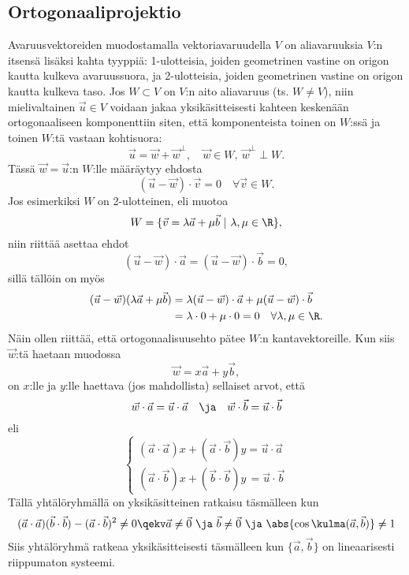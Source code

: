 
\subsection{Ortogonaaliprojektio}

Avaruusvektoreiden muodostamalla vektoriavaruudella $V$ on aliavaruuksia $V$:n itsensä lisäksi
kahta tyyppiä: 1-ulotteisia, joiden geometrinen vastine on origon kautta kulkeva avaruussuora,
ja 2-ulotteisia, joiden geometrinen vastine on origon kautta kulkeva taso.
Jos $W \subset V$ on $V$:n aito aliavaruus (ts. $W \neq V$), niin mielivaltainen $\vec u \in V$
voidaan jakaa yksikäsitteisesti kahteen keskenään ortogonaaliseen komponenttiin siten, että 
komponenteista toinen on $W$:ssä ja toinen $W$:tä vastaan kohtisuora:
\[
\vec u = \vec w + \vec w^{\perp}, \quad  \vec w \in W, \ \vec w^{\perp} \perp W.
\]
Tässä $\vec w = \vec u$:n  $W$:lle määräytyy ehdosta
\[
(\vec u - \vec w) \cdot \vec v = 0 \quad \forall \vec v \in W.
\]
Jos esimerkiksi $W$ on 2-ulotteinen, eli muotoa
\[
W=\{\vec v = \lambda \vec a + \mu \vec b \ | \ \lambda, \mu \in \R \},
\]
niin riittää asettaa ehdot
\[
(\vec u - \vec w) \cdot \vec a =(\vec u -\vec w) \cdot \vec b =0,
\]
sillä tällöin on myös
\begin{align*}
(\vec u - \vec w)(\lambda \vec a + \mu \vec b)
             &=\lambda(\vec u - \vec w) \cdot \vec a + \mu (\vec u-\vec w) \cdot \vec b \\
             &=\lambda \cdot 0 + \mu \cdot 0 = 0 \quad \forall \lambda, \mu \in \R.
\end{align*}
Näin ollen riittää, että ortogonaalisuusehto pätee $W$:n kantavektoreille. Kun siis $\vec w$:tä
haetaan muodossa
\[
\vec w = x \vec a +y \vec b,
\]
on $x$:lle ja $y$:lle haettava (jos mahdollista) sellaiset arvot, että
\[
\vec w \cdot \vec a = \vec u \cdot \vec a \quad \ja \quad \vec w \cdot \vec b 
                    = \vec u \cdot \vec b
\]
eli
\[ \begin{cases}
(\vec a \cdot \vec a)x+(\vec a \cdot \vec b)y  = \vec u \cdot \vec a \\
(\vec a \cdot \vec b)x+(\vec b \cdot \vec b)y\,= \vec u \cdot \vec b
\end{cases} \]
Tällä yhtälöryhmällä on yksikäsitteinen ratkaisu täsmälleen kun
\[
(\vec a \cdot \vec a)(\vec b \cdot \vec b) - (\vec a \cdot \vec b)^2 \neq 0
                                           \qekv \vec a \neq \vec 0\ 
                                            \ja\ \vec b \neq \vec 0\ 
                                            \ja\ \abs{\cos{\kulma(\vec a,\vec b)}} \neq 1
\]
Siis yhtälöryhmä ratkeaa yksikäsitteisesti täsmälleen kun $\{\vec a, \vec b\}$ on lineaarisesti
riippumaton systeemi.

